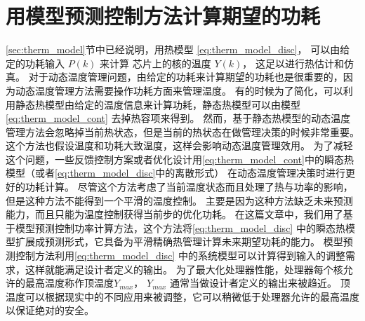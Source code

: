 \section{用模型预测控制方法计算期望的功耗}\label{sec:mpc}

\ref{sec:therm_model}节中已经说明，用热模型 \eqref{eq:therm_model_disc}， 可以由给定的功耗输入 $P(k)$ 来计算
芯片上的核的温度 $Y(k)$， 这足以进行热估计和仿真。
对于动态温度管理问题，由给定的功耗来计算期望的功耗也是很重要的，因为动态温度管理方法需要操作功耗方面来管理温度。
有的时候为了简化，可以利用静态热模型由给定的温度信息来计算功耗，静态热模型可以由模型 \eqref{eq:therm_model_cont} 去掉热容项来得到。
然而，基于静态热模型的动态温度管理方法会忽略掉当前热状态，但是当前的热状态在做管理决策的时候非常重要。
这个方法也假设温度和功耗大致温度，这样会影响动态温度管理效用。
为了减轻这个问题，一些反馈控制方案或者优化设计用\eqref{eq:therm_model_cont}中的瞬态热模型（或者\eqref{eq:therm_model_disc}中的离散形式）
在动态温度管理决策时进行更好的功耗计算。
尽管这个方法考虑了当前温度状态而且处理了热与功率的影响，但是这种方法不能得到一个平滑的温度控制。
主要是因为这种方法缺乏未来预测能力，而且只能为温度控制获得当前步的优化功耗。
在这篇文章中，我们用了基于模型预测控制功率计算方法，这个方法将\eqref{eq:therm_model_disc} 中的瞬态热模型扩展成预测形式，它具备为平滑精确热管理计算未来期望功耗的能力。
模型预测控制方法利用\eqref{eq:therm_model_disc} 中的系统模型可以计算得到输入的调整需求，这样就能满足设计者定义的输出。
为了最大化处理器性能，处理器每个核允许的最高温度称作顶温度$Y_{max}$， $Y_{max}$ 通常当做设计者定义的输出来被趋近。
顶温度可以根据现实中的不同应用来被调整，它可以稍微低于处理器允许的最高温度以保证绝对的安全。


